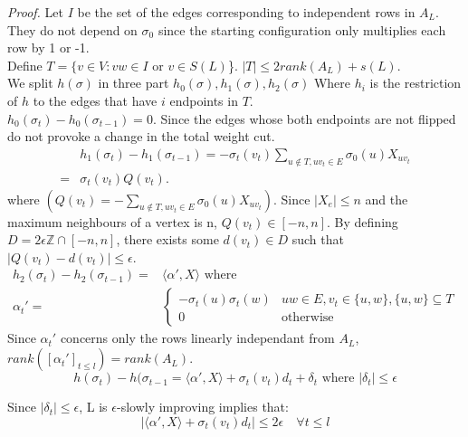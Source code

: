 \textit{Proof.} Let $I$ be the set of the edges corresponding to independent rows in $A_L$. They do not depend on $\sigma_0$ since the starting configuration only multiplies each row by 1 or -1.\\
Define $T = \{v \in V: vw \in I \text{ or } v \in S(L)$\}. $|T| \leq 2 rank(A_L) + s(L)$. \\
We split $h(\sigma)$ in three part $h_0(\sigma), h_1(\sigma), h_2(\sigma)$ Where $h_i$ is the restriction of $h$ to the edges that have $i$ endpoints in $T$. \\
$h_0(\sigma_t) - h_0(\sigma_{t -1}) = 0$. Since the edges whose both endpoints are not flipped do not provoke a change in the total weight cut. \\
\begin{equation*}
\begin{split}
&h_1(\sigma_t) - h_1(\sigma_{t-1}) = -\sigma_t(v_t)\sum_{u \not\in T, uv_t \in E}\sigma_0(u)X_{uv_t} \\
=& \sigma_t(v_t)Q(v_t).
\end{split}
\end{equation*}
where $(Q(v_t) = -\sum_{u \not\in T, uv_t \in E}\sigma_0(u)X_{uv_t})$. Since $|X_e| \leq n$ and the maximum neighbours of a vertex is n, $Q(v_t) \in [-n, n]$. By defining $D = 2\epsilon\mathbb Z \cap [-n, n]$, there exists some $d(v_t) \in D$ such that $|Q(v_t) - d(v_t)| \leq \epsilon$.\\
\begin{equation*}
\begin{split}
h_2(\sigma_t) - h_2(\sigma_{t-1}) = &\langle\alpha ', X \rangle \text{ where }\\
\alpha_t ' =  &
\begin{cases}
-\sigma_t(u)\sigma_t(w) & uw \in E, v_t \in \{u, w\}, \{u, w\} \subseteq T \\
0 & \text{otherwise}
\end{cases}
\end{split}
\end{equation*}
Since $\alpha_t'$ concerns only the rows linearly independant from $A_L$, $rank([\alpha_t']_{t \leq l}) = rank(A_L)$. \\
\begin{equation*}
h(\sigma_t) - h(\sigma_{t-1} = \langle\alpha ', X \rangle +   \sigma_t(v_t)d_t + \delta_t \text{    where }|\delta_t| \leq \epsilon
\end{equation*}

Since  $|\delta_t| \leq \epsilon$, L is $\epsilon$-slowly improving implies that: 
\begin{equation*}
| \langle\alpha ', X \rangle +   \sigma_t(v_t)d_t| \leq 2\epsilon \quad \forall t \leq l
\end{equation*}

